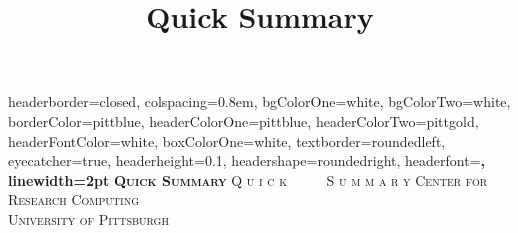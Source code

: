 \documentclass[landscape,a0paper,fontscale=0.285]{baposter} %
\title{Quick Summary}
\begin{document}
\begin{poster}
{
 headerborder=closed, %
 colspacing=0.8em, %
 bgColorOne=white, %
 bgColorTwo=white, %
 borderColor=pittblue, %
 headerColorOne=pittblue, %
 headerColorTwo=pittgold, %
 headerFontColor=white, %
 boxColorOne=white, %
 textborder=roundedleft, %
 eyecatcher=true, %
 headerheight=0.1\textheight, %
 headershape=roundedright, %
 headerfont=\Large\bf\textsc, %
 linewidth=2pt %
}
{\bf\textsc{Quick Summary}\vspace{0.5em}} %
{\textsc{Q u i c k \ \ \ \ \ S u m m a r y \hspace{12pt}}}
{\textsc{Center for Research Computing \\ University of Pittsburgh \hspace{12pt}}} 

\end{poster}
\end{document}
